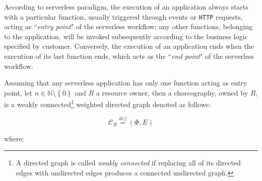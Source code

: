 \documentclass[12pt,a4paper]{report}
\newcommand{\mathDef}{\overset{\textit{def}}{=}}
\newcommand{\N}{\mathbb{N}}
\newcommand{\SetMinusZero}{\setminus \left\{0\right\}}
\begin{document}
According to serverless paradigm, the execution of an application always starts with a particular function, usually triggered through events or \texttt{HTTP} requests, acting as ``\textit{entry point}" of the serverless workflow; any other functions, belonging to the application, will be invoked subsequently according to the business logic specified by customer. Conversely, the execution of an application ends when the execution of its last function ends, which acts as the ``\textit{end point}" of the serverless workflow. 

Assuming that any serverless application has only one function acting as entry point, let $n \in \N \SetMinusZero$ and $R$ a resource owner, then a choreography, owned by $R$, is a weakly connected\footnote{A directed graph is called \textit{weakly connected} if replacing all of its directed edges with undirected edges produces a connected undirected graph.} weighted directed graph denoted as follows:

\begin{equation}
	\mathcal{C}_R \mathDef (\Phi,E)
\end{equation}

where:
\end{document}

